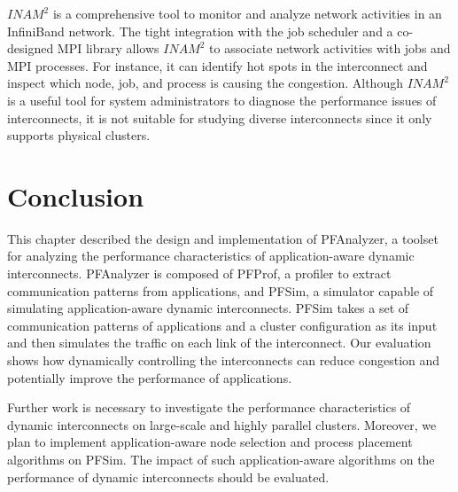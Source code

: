 \(\mathit{INAM}^2\) \autocite{Subramoni2016} is a comprehensive tool to
monitor and analyze network activities in an InfiniBand network. The
tight integration with the job scheduler and a co-designed MPI library
allows \(\mathit{INAM}^2\) to associate network activities with jobs and
MPI processes. For instance, it can identify hot spots in the
interconnect and inspect which node, job, and process is causing the
congestion. Although \(\mathit{INAM}^2\) is a useful tool for system
administrators to diagnose the performance issues of interconnects, it
is not suitable for studying diverse interconnects since it only
supports physical clusters.

\section{Conclusion}\label{ii-conclusion}

This chapter described the design and implementation of PFAnalyzer, a
toolset for analyzing the performance characteristics of
application-aware dynamic interconnects. PFAnalyzer is composed of
PFProf, a profiler to extract communication patterns from applications,
and PFSim, a simulator capable of simulating application-aware dynamic
interconnects. PFSim takes a set of communication patterns of
applications and a cluster configuration as its input and then simulates
the traffic on each link of the interconnect. Our evaluation shows how
dynamically controlling the interconnects can reduce congestion and
potentially improve the performance of applications.

Further work is necessary to investigate the performance characteristics
of dynamic interconnects on large-scale and highly parallel clusters.
Moreover, we plan to implement application-aware node selection and
process placement algorithms on PFSim. The impact of such
application-aware algorithms on the performance of dynamic interconnects
should be evaluated.
